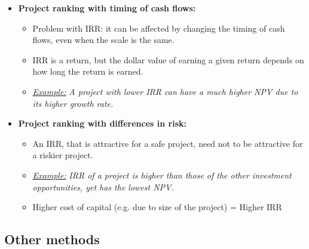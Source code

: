\documentclass[ieeetran]{article}
\begin{document}
\begin{itemize}
\item \textbf{Project ranking with timing of cash flows:}
	\begin{itemize}
	\item Problem with IRR: it can be affected by changing the timing of cash flows, even when the scale is the same.
	\item IRR is a return, but the dollar value of earning a given return depends on how long the return is earned.
	\item \underline{\textit{Example:}} \textit{A project with lower IRR can have a much higher NPV due to its higher growth rate.}
	\end{itemize}

\item \textbf{Project ranking with differences in risk:}
	\begin{itemize}
	  \item An IRR, that is attractive for a safe project, need not to be attractive for a riskier project.
	\item \underline{\textit{Example:}} \textit{IRR of a project is higher than those of the other investment opportunities, yet has the lowest NPV.}
	\item Higher cost of capital (e.g. due to size of the project) = Higher IRR
	\end{itemize}

\end{itemize}

\subsection{Other methods} %
\label{ssub:other_methods}
\end{document}
